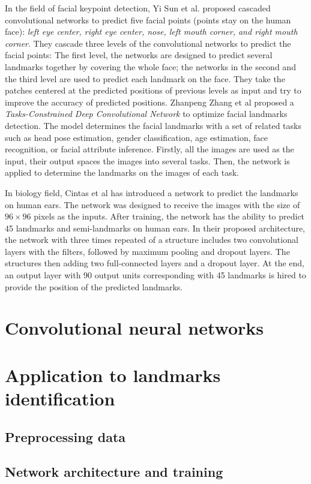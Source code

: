 \documentclass[conference]{IEEEtran}
\begin{document}
In the field of facial keypoint detection, Yi Sun et al.\cite{sun2013deep} proposed cascaded convolutional networks to predict five facial points (points stay on the human face): \textit{left eye center, right eye center, nose, left mouth corner, and right mouth corner}. They cascade three levels of the convolutional networks to predict the facial points: The first level, the networks are designed to predict several landmarks together by covering the whole face; the networks in the second and the third level are used to predict each landmark on the face. They take the patches centered at the predicted positions of previous levels as input and try to improve the accuracy of predicted positions. Zhanpeng Zhang et al\cite{zhang2014facial} proposed a \textit{Tasks-Constrained Deep Convolutional Network} to optimize facial landmarks detection. The model determines the facial landmarks with a set of related tasks such as head pose estimation, gender classification, age estimation, face recognition, or facial attribute inference. Firstly, all the images are used as the input, their output spaces the images into several tasks. Then, the network is applied to determine the landmarks on the images of each task. 

In biology field, Cintas et al\cite{cintas2016automatic} has introduced a network to predict the landmarks on human ears. The network was designed to receive the images with the size of $96 \times 96$ pixels as the inputs. After training, the network has the ability to predict 45 landmarks and semi-landmarks on human ears. In their proposed architecture, the network with three times repeated of a structure includes two convolutional layers with the filters, followed by maximum pooling and dropout layers. The structures then adding two full-connected layers and a dropout layer. At the end, an output layer with 90 output units corresponding with 45 landmarks is hired to provide the position of the predicted landmarks.
\section{Convolutional neural networks}
\section{Application to landmarks identification}
\subsection{Preprocessing data}
\subsection{Network architecture and training}
\end{document}
